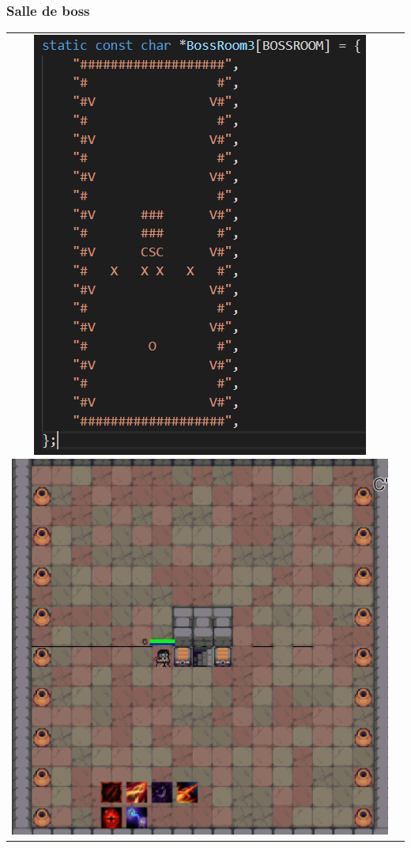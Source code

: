 \documentclass[french]{beamer}
\begin{document}
\begin{frame}
\frametitle{Salle de boss}
\begin{tabular}{  c  c  }
\includegraphics[scale=0.6]{./BossRoom}
\includegraphics[scale=0.19]{./Salle_Boss}
\end{tabular}
\end{frame}
\end{document}
